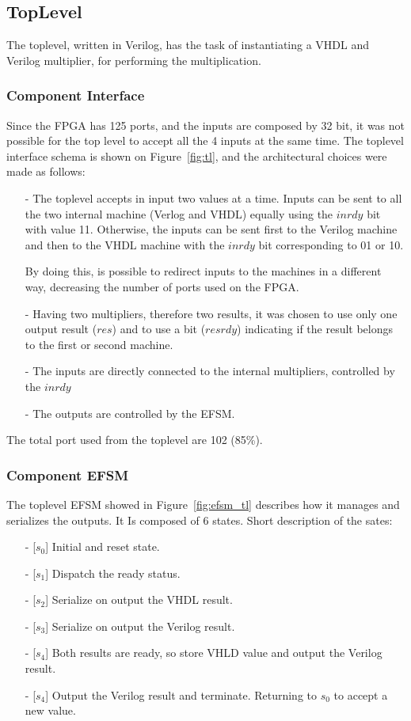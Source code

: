 \documentclass[]{IEEEtran}
\begin{document}
	\subsection{TopLevel}
	The toplevel, written in Verilog, has the task of instantiating a VHDL and Verilog multiplier, for performing the multiplication.
	
	\subsubsection{Component Interface}
	Since the FPGA has 125 ports, and the inputs are composed by 32 bit, it was not possible for the top level to accept all the 4 inputs at the same time. The toplevel interface schema is shown on Figure~\ref{fig:tl}, and the architectural choices were made as follows:
	\begin{itemize}
		\item [-] The toplevel accepts in input two values at a time. Inputs can be sent to all the two internal machine (Verlog and VHDL)  equally using the $inrdy$ bit with value 11. Otherwise, the inputs can be sent first to the Verilog machine and then to the VHDL machine with the $inrdy$ bit corresponding to 01 or 10. 
		
		By doing this, is possible to redirect inputs to the machines in a different way, decreasing the number of ports used on the FPGA.
		\item [-] Having two multipliers, therefore two results, it was chosen to use only one output result ($res$) and to use a bit ($resrdy$) indicating if the result belongs to the first or second machine.
		\item [-] The inputs are directly connected to the internal multipliers, controlled by the $inrdy$
		\item [-] The outputs are controlled by the EFSM.
	\end{itemize}

	The total port used from the toplevel are 102 (85\%).
	
	\subsubsection{Component EFSM}
	The toplevel EFSM showed in Figure~\ref{fig:efsm_tl} describes how it manages and serializes the outputs.
	It Is composed of 6 states. Short description of the sates:
	\begin{itemize}
		\item [-] [$s_0$] Initial and reset state.
		\item [-] [$s_1$] Dispatch the ready status.
		\item [-] [$s_2$] Serialize on output the VHDL result.
		\item [-] [$s_3$] Serialize on output the Verilog result.
		\item [-] [$s_4$] Both results are ready, so store VHLD value and output the Verilog result.
		\item [-] [$s_4$] Output the Verilog result and terminate. Returning to $s_0$ to accept a new value.
	\end{itemize}
\end{document}
